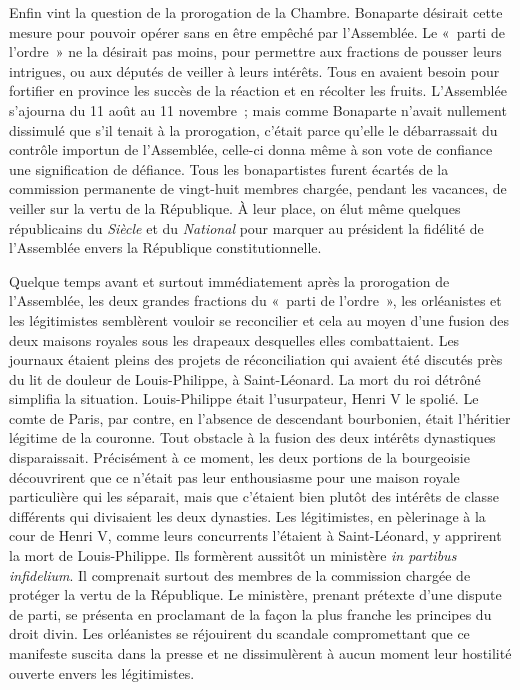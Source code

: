 \documentclass[twoside]{book} %
\begin{document}
Enfin vint la question de la prorogation de la Chambre. Bonaparte désirait cette mesure pour pouvoir opérer sans en être empêché par l’Assemblée. Le « parti de l’ordre » ne la désirait pas moins, pour permettre aux fractions de pousser leurs intrigues, ou aux députés de veiller à leurs intérêts. Tous en avaient besoin pour fortifier en province les succès de la réaction et en récolter les fruits. L’Assemblée s’ajourna du 11 août au 11 novembre ; mais comme Bonaparte n’avait nullement dissimulé que s’il tenait à la prorogation, c’était parce qu’elle le débarrassait du contrôle importun de l’Assemblée, celle-ci donna même à son vote de confiance une signification de défiance. Tous les bonapartistes furent écartés de la commission permanente de vingt-huit membres chargée, pendant les vacances, de veiller sur la vertu de la République. À leur place, on élut même quelques républicains du \emph{Siècle} et du \emph{National} pour marquer au président la fidélité de l’Assemblée envers la République constitutionnelle.\par
Quelque temps avant et surtout immédiatement après la prorogation de l’Assemblée, les deux grandes fractions du « parti de l’ordre », les orléanistes et les légitimistes semblèrent vouloir se reconcilier et cela au moyen d’une fusion des deux maisons royales sous les drapeaux desquelles elles combattaient. Les journaux étaient pleins des projets de réconciliation qui avaient été discutés près du lit de douleur de Louis-Philippe, à Saint-Léonard. La mort du roi détrôné simplifia la situation. Louis-Philippe était l’usurpateur, Henri V le spolié. Le comte de Paris, par contre, en l’absence de descendant bourbonien, était l’héritier légitime de la couronne. Tout obstacle à la fusion des deux intérêts dynastiques disparaissait. Précisément à ce moment, les deux portions de la bourgeoisie découvrirent que ce n’était pas leur enthousiasme pour une maison royale particulière qui les séparait, mais que c’étaient bien plutôt des intérêts de classe différents qui divisaient les deux dynasties. Les légitimistes, en pèlerinage à la cour de Henri V, comme leurs concurrents l’étaient à Saint-Léonard, y apprirent la mort de Louis-Philippe. Ils formèrent aussitôt un ministère \emph{in partibus infidelium}. Il comprenait surtout des membres de la commission chargée de protéger la vertu de la République. Le ministère, prenant prétexte d’une dispute de parti, se présenta en proclamant de la façon la plus franche les principes du droit divin. Les orléanistes se réjouirent du scandale compromettant que ce manifeste suscita dans la presse et ne dissimulèrent à aucun moment leur hostilité ouverte envers les légitimistes.\par
\end{document}
